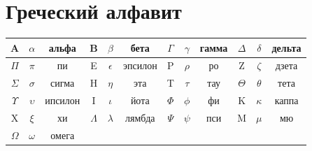 \documentclass[a5paper, 8pt]{extarticle}
\begin{document}
\section{Греческий алфавит}

\begin{center}
{\setlength{\extrarowheight}{3pt}
\begin{tabular}{|c|c|c|c|c|c|c|c|c|c|c|c|}
\hline 
\rowcolor{Gray}
A & $\alpha$ & альфа& B & $\beta$ & бета & $\Gamma$ & $\gamma$ & гамма & $\Delta$ & $\delta$ & дельта\\ 
\hline 
$\Pi$ & $\pi$ & пи& E & $\epsilon$ & эпсилон & P & $\rho$ & ро & Z & $\zeta$ & дзета \\ 
\hline 
\rowcolor{Gray}
$\Sigma$ & $\sigma$ & сигма & H & $\eta$ & эта & T & $\tau$ & тау & $\Theta$ & $\theta$ & тета\\ 
\hline 
$\Upsilon$ & $\upsilon$ & ипсилон & I & $\iota$ & йота & $\Phi$ & $\phi$ & фи & K & $\kappa$ & каппа \\ 
\hline 
\rowcolor{Gray}
X & $\xi$ & хи & $\Lambda$ & $\lambda$ & лямбда & $\Psi$ & $\psi$ & пси & M & $\mu$ & мю\\ 
\hline
$\Omega$ & $\omega$ & омега & &  & & & & & & & \\ 
\hline 

\end{tabular} 
}
\end{center}
\end{document}
